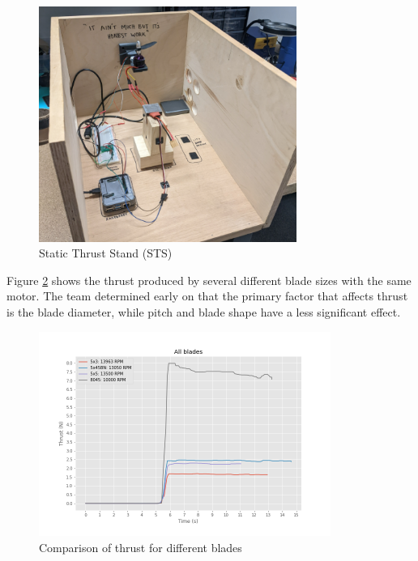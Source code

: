 \begin{figure}[H]
    \centering
    \includegraphics[width=0.75\textwidth]{src/figs/STS.png}
    \caption{Static Thrust Stand (STS)}
    \label{design:STS}
\end{figure}
Figure \ref{design:diff_blades} shows the thrust produced by several different blade sizes with the same motor. The team determined early on that the primary factor that affects thrust is the blade diameter, while pitch and blade shape have a less significant effect.
\begin{figure}[H]
    \centering
    \includegraphics[width=0.85\textwidth]{src/figs/STS_4_diff_blades.png}
    \caption{Comparison of thrust for different blades}
    \label{design:diff_blades}
\end{figure}

